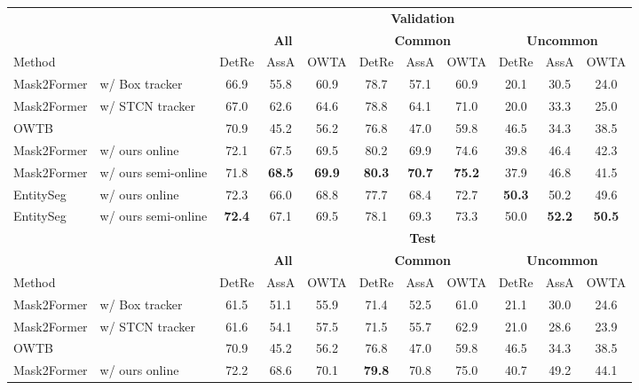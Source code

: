 \begin{table*}
\small
    \centering
\begin{tabular}{llccccccccc}
\toprule
& & \multicolumn{9}{c}{\textbf{Validation}} \\
\cmidrule(lr){3-11}
& & \multicolumn{3}{c}{\textbf{All}} & \multicolumn{3}{c}{\textbf{Common}} & \multicolumn{3}{c}{\textbf{Uncommon}} \\
\cmidrule(lr){3-5} \cmidrule(lr){6-8} \cmidrule(lr){9-11}
Method & & DetRe & AssA & OWTA & DetRe & AssA & OWTA & DetRe & AssA & OWTA \\
\midrule
Mask2Former & w/ Box tracker~\cite{athar2023burst} & 66.9 & 55.8 & 60.9 & 78.7 & 57.1 & 60.9 & 20.1 & 30.5 & 24.0 \\
Mask2Former & w/ STCN tracker~\cite{athar2023burst} & 67.0 & 62.6 & 64.6 & 78.8 & 64.1 & 71.0 & 20.0 & 33.3 & 25.0 \\
OWTB~\cite{liu2022opening} & & 70.9 & 45.2 & 56.2 & 76.8 & 47.0 & 59.8 & 46.5 & 34.3 & 38.5 \\
Mask2Former & w/ ours online & 72.1 & 67.5 & 69.5 & 80.2 & 69.9 & 74.6 & 39.8 & 46.4 & 42.3 \\
Mask2Former & w/ ours semi-online & 71.8 & \textbf{68.5} & \textbf{69.9} & \textbf{80.3} & \textbf{70.7} & \textbf{75.2} & 37.9 & 46.8 & 41.5 \\
EntitySeg & w/ ours online & 72.3 & 66.0 & 68.8 & 77.7 & 68.4 & 72.7 & \textbf{50.3} & 50.2 & 49.6 \\
EntitySeg & w/ ours semi-online & \textbf{72.4} & 67.1 & 69.5 & 78.1 & 69.3 & 73.3 & 50.0 & \textbf{52.2} & \textbf{50.5} \\
\midrule
& & \multicolumn{9}{c}{\textbf{Test}} \\
\cmidrule(lr){3-11}
& & \multicolumn{3}{c}{\textbf{All}} & \multicolumn{3}{c}{\textbf{Common}} & \multicolumn{3}{c}{\textbf{Uncommon}} \\
\cmidrule(lr){3-5} \cmidrule(lr){6-8} \cmidrule(lr){9-11}
Method & & DetRe & AssA & OWTA & DetRe & AssA & OWTA & DetRe & AssA & OWTA \\
\midrule
Mask2Former & w/ Box tracker~\cite{athar2023burst} & 61.5 & 51.1 & 55.9 & 71.4 & 52.5 & 61.0 & 21.1 & 30.0 & 24.6 \\
Mask2Former & w/ STCN tracker~\cite{athar2023burst} & 61.6 & 54.1 & 57.5 & 71.5 & 55.7 & 62.9 & 21.0 & 28.6 & 23.9 \\
OWTB~\cite{liu2022opening} & & 70.9 & 45.2 & 56.2 & 76.8 & 47.0 & 59.8 & 46.5 & 34.3 & 38.5 \\
Mask2Former & w/ ours online & 72.2 & 68.6 & 70.1 & \textbf{79.8} & 70.8 & 75.0 & 40.7 & 49.2 & 44.1 \\

\end{tabular}
\end{table*}
